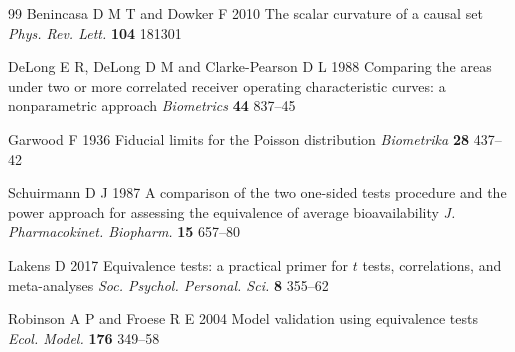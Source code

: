 \begin{thebibliography}{99}
 Benincasa D M T and Dowker F 2010 The scalar curvature of a causal set \textit{Phys. Rev. Lett.} \textbf{104} 181301

 DeLong E R, DeLong D M and Clarke-Pearson D L 1988 Comparing the areas under two or more correlated receiver operating characteristic curves: a nonparametric approach \textit{Biometrics} \textbf{44} 837--45

 Garwood F 1936 Fiducial limits for the Poisson distribution \textit{Biometrika} \textbf{28} 437--42

 Schuirmann D J 1987 A comparison of the two one-sided tests procedure and the power approach for assessing the equivalence of average bioavailability \textit{J. Pharmacokinet. Biopharm.} \textbf{15} 657--80

 Lakens D 2017 Equivalence tests: a practical primer for $t$ tests, correlations, and meta-analyses \textit{Soc. Psychol. Personal. Sci.} \textbf{8} 355--62

 Robinson A P and Froese R E 2004 Model validation using equivalence tests \textit{Ecol. Model.} \textbf{176} 349--58

\end{thebibliography}

